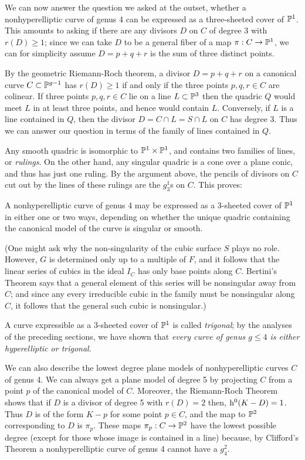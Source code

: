 We can now answer the question we asked at the outset, whether a nonhyperelliptic curve of genus 4 can be expressed as a three-sheeted cover of $\PP^1$. This amounts to asking if there are any divisors $D$ on $C$ of degree 3 with $r(D) \geq 1$; since we can take $D$ to be a general fiber of a map $\pi : C \to \PP^1$, we can for simplicity assume $D = p+q+r$ is the sum of three distinct points.

By the geometric Riemann-Roch theorem, a divisor $D = p+q+r$ on a canonical curve $C \subset \PP^{g-1}$ has $r(D) \geq 1$ if and only if the three points $p,q,r \in C$ are colinear. If three points $p,q,r \in C$ lie on a line $L \subset \PP^3$ then the quadric $Q$ would meet $L$ in at least three points, and hence would contain $L$. Conversely,  if $L$ is a line contained in $Q$, then the divisor $D = C \cap L = S \cap L$ on $C$ has degree  3. Thus we can answer our question in terms of the family of lines contained in $Q$.

Any smooth quadric is isomorphic to $\PP^1\times \PP^1$, and contains two families of lines, or \emph{rulings}. On the other hand, any singular quadric is a cone over a plane conic, and thus has just one ruling. By the argument above, the pencils of divisors on $C$ cut out by the lines of these rulings are the $g^1_3$s on $C$. This proves:

\begin{proposition}\label{genus 4 trigonal}
A nonhyperelliptic curve of genus 4 may be expressed as a 3-sheeted cover of $\PP^1$ in either one or two ways, depending on whether the unique quadric containing the canonical model of the curve is singular or smooth.
\end{proposition}

 (One might ask why the non-singularity of the cubic surface $S$ plays no role. However, $G$ is determined only up to a multiple of $F$, and it follows that the linear series of cubics in the ideal
$I_C$ has only base points along $C$. Bertini's Theorem says that a general element of this series will be nonsingular away from $C$; and since any every irreducible cubic in the family must be nonsingular along $C$, it follows that the general such cubic is nonsingular.)

A curve expressible as a 3-sheeted cover of $\PP^1$ is called \emph{trigonal}; by the analyses of the preceding sections, we have shown that \emph{every curve of genus $g \leq 4$ is either hyperelliptic or trigonal}. 

We can also describe the lowest degree plane models of nonhyperelliptic curves $C$ of genus 4. 
We can always get a plane model of degree 5 by projecting $C$ from a point $p$ of the canonical model of $C$. Moreover, the Riemann-Roch Theorem shows that if $D$ is a divisor of degree 5 with $r(D)=2$ then,  $\h^0(K-D) = 1$. Thus $D$ is of the form $K-p$ for some point $p \in C$, and the map to $\PP^2$ corresponding to $D$ is $\pi_p$. These  maps $\pi_p: C\to \PP^2$ have the lowest possible degree (except for those whose image is  contained in a line) because, by Clifford's Theorem a nonhyperelliptic curve of genus 4 cannot have a $g^2_4$.

